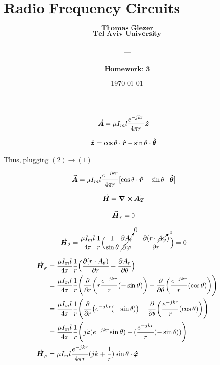 \documentclass[12pt, letterpaper]{article}
\title{
  \Large $\textbf{Radio Frequency Circuits \& Antenna}$
}
\author{
  $\textbf{Thomas Glezer}$\\
  $\textbf{Tel Aviv University}$\\\\
  ---\\\\
  $\textbf{Homework: 3}$\\
}
\date{\today}
\begin{document}
\begin{align}
  \va*{A}
  &=
  \mu I_ml
  {e^{-jkr}\over 4\pi r}
  \vu*{z}
\end{align}

\begin{align}
  \vu*{z}
  &=
  \cos\theta\cdot\vu*{r}
  -
  \sin\theta\cdot\vu*{\theta}
\end{align}

\vspace{1em}

\begin{center}
  Thus, plugging $(2)\rightarrow(1)$
\end{center}

\vspace{1em}

\begin{align}
  \va*{A}
  &=
  \mu I_ml
  {e^{-jkr}\over 4\pi r}
  [
    \cos\theta\cdot\vu*{r}
  -
  \sin\theta\cdot\vu*{\theta}
  ]
\end{align}

\begin{align}
  \va*{H}
  &=
  \curl\va*{A_T}
\end{align}

\begin{align}
  \va*{H}_r
  &=
  0
\end{align}

\begin{align}
  \va*{H}_\theta
  &=
  {\mu I_ml\over4\pi}{1\over r}
  \Bigl(
    {1\over\sin\theta}
    \cancelto{0}{\pdv{A_r}{\varphi}}
    -
    \pdv{(r\cdot \cancelto{0}{A_\varphi})}{r}
  \Bigr)
  =
  0
\end{align}

\begin{align}
  \va*{H}_\varphi
  &=
  {\mu I_ml\over4\pi}{1\over r}
  \Bigl(
    \pdv{(r\cdot A_\theta)}{r}
    -
    \pdv{A_r}{\theta}
  \Bigr)
  \\
  &=
  {\mu I_ml\over4\pi}{1\over r}
  \Biggl(
    \pdv{r}(r{e^{-jkr}\over r}(-\sin\theta))
    -
    \pdv{\theta}({e^{-jkr}\over r}(\cos\theta))
  \Biggr)
  \\
  &=
  {\mu I_ml\over4\pi}{1\over r}
  \Biggl(
    \pdv{r}(e^{-jkr}(-\sin\theta))
    -
    \pdv{\theta}({e^{-jkr}\over  r}(\cos\theta))
  \Biggr)
  \\
  &=
  {\mu I_ml\over4\pi}{1\over r}
  \Biggl(
    jk(e^{-jkr}\sin\theta)
    -
    ({e^{-jkr}\over  r}(-\sin\theta))
  \Biggr)
  \\
  \va*{H}_\varphi
  &=
  \mu I_ml{e^{-jkr}\over4\pi r}(jk+{1\over r})\sin\theta\cdot\vu*{\varphi}
\end{align}
\end{document}
